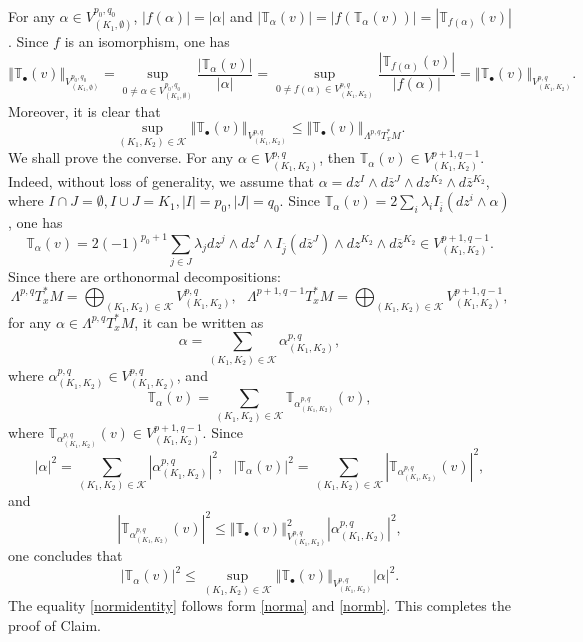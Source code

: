 \documentclass[12pt, reqno]{amsart}
\theoremstyle{plain}
\theoremstyle{definition}
\renewcommand{\bar}{\overline}
\newcommand{\beq}{\begin{equation}}
\newcommand{\eeq}{\end{equation}}
\renewcommand{\>}{\rightarrow}
\renewcommand{\#}{\sharp}
\newcommand{\nm}[1]{\left\Vert #1\right\Vert}
\numberwithin{equation}{section} %
\begin{document}
\noindent For any $ \alpha \in  V_{(K_1,\emptyset)}^{p_0,q_0} $,  $|f(\alpha)| = |\alpha|$ and
$|\mathbb{T}_\alpha(v)| = |f(\mathbb{T}_\alpha(v))| = |\mathbb{T}_{f(\alpha)}(v)|$.
Since $ f $ is an isomorphism, one has
\beq \nm{\mathbb{T}_\bullet(v)}_{V^{p_0,q_0}_{(K_1,\emptyset)}} = \sup_{0 \neq \alpha \in V^{p_0,q_0}_{(K_1,\emptyset)}} \frac{|\mathbb{T}_\alpha(v)|}{|\alpha|} = \sup_{0 \neq f(\alpha) \in V^{p,q}_{(K_1,K_2)}} \frac{|\mathbb{T}_{f(\alpha)}(v)|}{|f(\alpha)|} = \nm{\mathbb{T}_\bullet(v)}_{V_{(K_1,K_2)}^{p,q}}. \eeq
Moreover,  it is clear that
\beq \sup_{(K_1,K_2) \in \mathscr{K}} \nm{\mathbb{T}_\bullet(v)}_{V_{(K_1,K_2)}^{p,q}} \leq \nm{\mathbb{T}_\bullet(v)}_{\Lambda^{p,q}T_x^*M}. \label{norma}\eeq
We shall prove the converse. For any $ \alpha \in V_{(K_1,K_2)}^{p,q} $, then $ \mathbb{T}_\alpha(v) \in V_{(K_1,K_2)}^{p+1,q-1} $. Indeed,  without loss of generality,  we assume that $ \alpha =  dz^I \wedge d\bar z{}^J \wedge dz^{K_2} \wedge d\bar z{}^{K_2} $, where $ I \cap J = \emptyset, I \cup J = K_1, |I| = p_0, |J| = q_0 $. Since $ \mathbb{T}_\alpha(v) = 2\sum_i \lambda_i I_{\bar i}(dz^i \wedge \alpha) $, one has
\beq \mathbb{T}_\alpha(v) = 2(-1)^{p_0+1} \sum_{j \in J} \lambda_j dz^j \wedge dz^I \wedge I_{\bar j}(d\bar z{}^J) \wedge dz^{K_2} \wedge d\bar z{}^{K_2} \in V_{(K_1,K_2)}^{p+1,q-1}. \eeq
Since there are orthonormal decompositions:
\beq \Lambda^{p,q}T^*_xM = \bigoplus_{(K_1,K_2) \in \mathscr{K}} V_{(K_1,K_2)}^{p,q}, \ \ \  \Lambda^{p+1,q-1}T^*_xM = \bigoplus_{(K_1,K_2) \in \mathscr{K}} V_{(K_1,K_2)}^{p+1,q-1}, \eeq
for any $ \alpha \in \Lambda^{p,q}T^*_xM $, it can be written as
\beq \alpha = \sum_{(K_1,K_2)\in \mathscr{K}} \alpha_{(K_1,K_2)}^{p,q}, \eeq
where $ \alpha_{(K_1,K_2)}^{p,q} \in V_{(K_1,K_2)}^{p,q} $, and
\beq \mathbb{T}_\alpha(v) = \sum_{(K_1,K_2)\in \mathscr{K}} \mathbb{T}_{\alpha_{(K_1,K_2)}^{p,q}}(v), \eeq
where $ \mathbb{T}_{\alpha_{(K_1,K_2)}^{p,q}}(v) \in V_{(K_1,K_2)}^{p+1,q-1} $. Since
\beq |\alpha|^2 = \sum_{(K_1,K_2)\in \mathscr{K}} |\alpha_{(K_1,K_2)}^{p,q}|^2, \ \ \  |\mathbb{T}_\alpha(v)|^2 = \sum_{(K_1,K_2)\in \mathscr{K}} |\mathbb{T}_{\alpha_{(K_1,K_2)}^{p,q}}(v)|^2, \eeq
and
\beq |\mathbb{T}_{\alpha_{(K_1,K_2)}^{p,q}}(v) |^2 \leq \nm{\mathbb{T}_\bullet(v)}_{V_{(K_1,K_2)}^{p,q}}^2 |\alpha_{(K_1,K_2)}^{p,q}|^2, \eeq
one concludes that
\beq |\mathbb{T}_\alpha(v)|^2 \leq \sup_{(K_1,K_2) \in \mathscr{K}} \nm{\mathbb{T}_\bullet(v)}_{V_{(K_1,K_2)}^{p,q}}|\alpha|^2.\label{normb} \eeq
The equality \eqref{normidentity} follows form \eqref{norma} and \eqref{normb}. This completes the proof of Claim.\\
\end{document}
